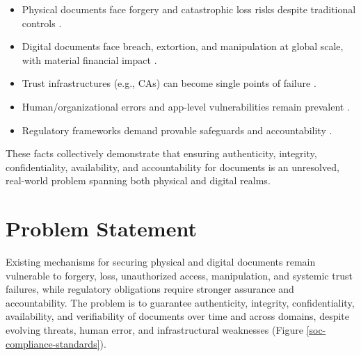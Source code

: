 \begin{itemize}
    \item Physical documents face forgery and catastrophic loss risks despite traditional controls \cite{interpol_identity_nodate,us_customs_and_border_protection_cincinnati_nodate,international_council_on_archives_emergency_nodate,geoengineerorg_cologne_nodate}.
    \item Digital documents face breach, extortion, and manipulation at global scale, with material financial impact \cite{verizon_2024_nodate,ibm_cost_nodate,ibm_cost_nodate-1,reuters__fbi_complaints_nodate}.
    \item Trust infrastructures (e.g., CAs) can become single points of failure \cite{wired_diginotar_nodate}.
    \item Human/organizational errors and app-level vulnerabilities remain prevalent \cite{hipaa_journal_verizon_nodate,owasp_top_nodate,owasp_a01_nodate}.
    \item Regulatory frameworks demand provable safeguards and accountability \cite{eur-lex_gdpr_nodate,eur-lex_eidas_nodate}.
\end{itemize}

These facts collectively demonstrate that ensuring authenticity, integrity, confidentiality, availability, and accountability for documents is an unresolved, real-world problem spanning both physical and digital realms.


\section{Problem Statement}
Existing mechanisms for securing physical and digital documents remain vulnerable to forgery, loss, unauthorized access, manipulation, and systemic trust failures, while regulatory obligations require stronger assurance and accountability. The problem is to guarantee authenticity, integrity, confidentiality, availability, and verifiability of documents over time and across domains, despite evolving threats, human error, and infrastructural weaknesses (Figure \ref{soc-compliance-standards}).

